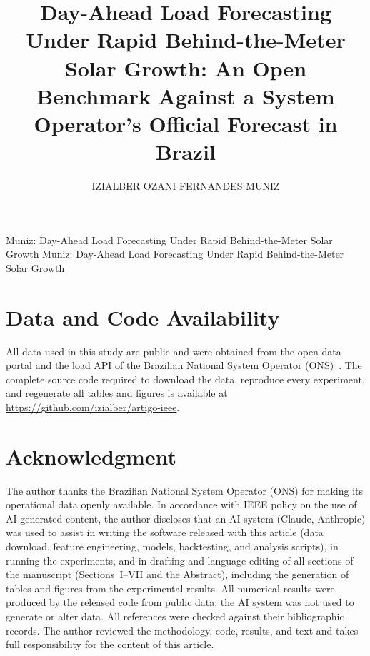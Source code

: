 \documentclass{ieeeaccess}
\begin{document}

\title{Day-Ahead Load Forecasting Under Rapid Behind-the-Meter Solar Growth: An Open Benchmark Against a System Operator's Official Forecast in Brazil}

\author{\uppercase{Izialber Ozani Fernandes Muniz}}

\address[1]{Graduate Program in Production and Systems Engineering (PPPRO), Federal Center for Technological Education of Rio de Janeiro (CEFET/RJ), Rio de Janeiro, RJ 20271-110, Brazil}

\markboth
{Muniz: Day-Ahead Load Forecasting Under Rapid Behind-the-Meter Solar Growth}
{Muniz: Day-Ahead Load Forecasting Under Rapid Behind-the-Meter Solar Growth}




\titlepgskip=-21pt

\maketitle









\section*{Data and Code Availability}
All data used in this study are public and were obtained from the open-data portal and the load API of the Brazilian National System Operator (ONS)~\cite{ons_opendata,ons_apicarga}. The complete source code required to download the data, reproduce every experiment, and regenerate all tables and figures is available at \url{https://github.com/izialber/artigo-ieee}.

\section*{Acknowledgment}
The author thanks the Brazilian National System Operator (ONS) for making its operational data openly available.
In accordance with IEEE policy on the use of AI-generated content, the author discloses that an AI system (Claude, Anthropic) was used to assist in writing the software released with this article (data download, feature engineering, models, backtesting, and analysis scripts), in running the experiments, and in drafting and language editing of all sections of the manuscript (Sections~I--VII and the Abstract), including the generation of tables and figures from the experimental results. All numerical results were produced by the released code from public data; the AI system was not used to generate or alter data. All references were checked against their bibliographic records. The author reviewed the methodology, code, results, and text and takes full responsibility for the content of this article.
\end{document}
